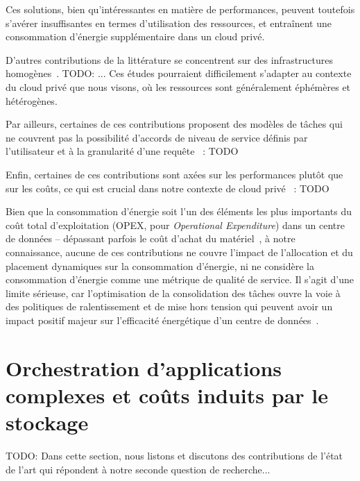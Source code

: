 Ces solutions, bien qu'intéressantes en matière de performances, peuvent toutefois s'avérer insuffisantes en termes d'utilisation des ressources, et entraînent une consommation d'énergie supplémentaire dans un cloud privé.

D'autres contributions de la littérature se concentrent sur des infrastructures homogènes~\cite{gujaratiSwayamDistributedAutoscaling2017, sureshENSUREEfficientScheduling2020, mampageDeadlineawareDynamicResource2021, singhviAtollScalableLowLatency2021, yangINFlessNativeServerless2022}. TODO: ...
Ces études pourraient difficilement s'adapter au contexte du cloud privé que nous visons, où les ressources sont généralement éphémères et hétérogènes.

Par ailleurs, certaines de ces contributions proposent des modèles de tâches qui ne couvrent pas la possibilité d'accords de niveau de service définis par l'utilisateur et à la granularité d'une requête~\cite{sureshENSUREEfficientScheduling2020, lingPigeonDynamicEfficient2019} : TODO

Enfin, certaines de ces contributions sont axées sur les performances plutôt que sur les coûts, ce qui est crucial dans notre contexte de cloud privé~\cite{gujaratiSwayamDistributedAutoscaling2017, lingPigeonDynamicEfficient2019, singhviAtollScalableLowLatency2021, choSLADrivenMLInference} : TODO

Bien que la consommation d'énergie soit l'un des éléments les plus importants du coût total d'exploitation (\gls{OPEX}, pour \textit{Operational Expenditure}) dans un centre de données -- dépassant parfois le coût d'achat du matériel~\cite{7279063}, à notre connaissance, aucune de ces contributions ne couvre l'impact de l'allocation et du placement dynamiques sur la consommation d'énergie, ni ne considère la consommation d'énergie comme une métrique de qualité de service. Il s'agit d'une limite sérieuse, car l'optimisation de la consolidation des tâches ouvre la voie à des politiques de ralentissement et de mise hors tension qui peuvent avoir un impact positif majeur sur l'efficacité énergétique d'un centre de données~\cite{chaurasiaComprehensiveSurveyEnergyaware2021}.

\section{Orchestration d'applications complexes et coûts induits par le stockage}
\label{section:sota-herocache}

TODO: Dans cette section, nous listons et discutons des contributions de l'état de l'art qui répondent à notre seconde question de recherche...

